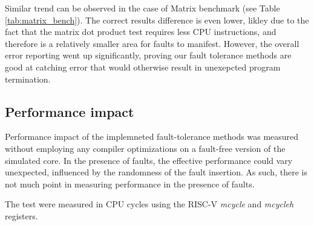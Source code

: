 \begin{table}[h]
\centering
{}
\caption{Matrix multiplication benchmark statistics}
\label{tab:matrix_bench}
\end{table}

Similar trend can be observed in the case of Matrix benchmark (see Table \ref{tab:matrix_bench}). The correct results difference is even lower, likley due to the fact that the matrix dot product test requires less CPU instructions, and therefore is a relatively smaller area for faults to manifest. However, the overall error reporting went up significantly, proving our fault tolerance methods are good at catching error that would otherwise result in unexepcted program termination.

\subsection{Performance impact}

Performance impact of the implemneted fault-tolerance methods was measured without employing any compiler optimizations on a fault-free version of the simulated core. In the presence of faults, the effective performance could vary unexpected, influenced by the randomness of the fault insertion. As such, there is not much point in measuring performance in the presence of faults.

The test were measured in CPU cycles using the RISC-V \textit{mcycle} and \textit{mcycleh} registers.

\begin{table}[h]
\centering
{}
\caption{Execution time comparison between unprotected and protected tests}
\label{tab:time_increase}
\end{table}

